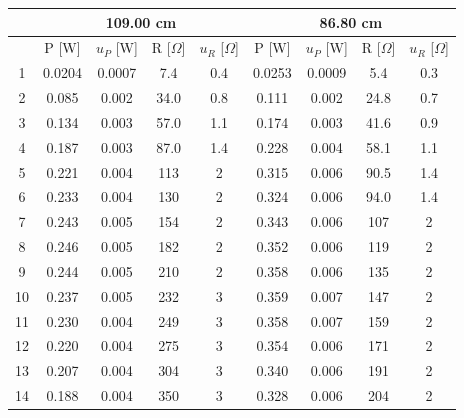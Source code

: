 \documentclass{article}
\begin{document}
{\begin{table}[H]
\begin{tabular}{@{}c|cc|cc||cc|cc@{}}
\toprule
 \multicolumn{1}{l}{}  & \multicolumn{4}{c||}{109.00 cm}                           & \multicolumn{4}{c}{86.80 cm}                         \\ \midrule
 \multicolumn{1}{l}{}  & P [W]  & $u_P$ [W] & R [$\Omega$] & $u_R$ [$\Omega$] & P [W]  & $u_P$ [W] & R [$\Omega$] & $u_R$ [$\Omega$] \\ \midrule
1  & 0.0204 & 0.0007    & 7.4          & 0.4              & 0.0253 & 0.0009    & 5.4          & 0.3              \\
2  & 0.085  & 0.002     & 34.0         & 0.8              & 0.111  & 0.002     & 24.8         & 0.7              \\
3  & 0.134  & 0.003     & 57.0         & 1.1              & 0.174  & 0.003     & 41.6         & 0.9              \\
4  & 0.187  & 0.003     & 87.0         & 1.4              & 0.228  & 0.004     & 58.1         & 1.1              \\
5  & 0.221  & 0.004     & 113          & 2                & 0.315  & 0.006     & 90.5         & 1.4              \\
6  & 0.233  & 0.004     & 130          & 2                & 0.324  & 0.006     & 94.0         & 1.4              \\
7  & 0.243  & 0.005     & 154          & 2                & 0.343  & 0.006     & 107          & 2                \\
8  & 0.246  & 0.005     & 182          & 2                & 0.352  & 0.006     & 119          & 2                \\
9  & 0.244  & 0.005     & 210          & 2                & 0.358  & 0.006     & 135          & 2                \\
10 & 0.237  & 0.005     & 232          & 3                & 0.359  & 0.007     & 147          & 2                \\
11 & 0.230  & 0.004     & 249          & 3                & 0.358  & 0.007     & 159          & 2                \\
12 & 0.220  & 0.004     & 275          & 3                & 0.354  & 0.006     & 171          & 2                \\
13 & 0.207  & 0.004     & 304          & 3                & 0.340  & 0.006     & 191          & 2                \\
14 & 0.188  & 0.004     & 350          & 3                & 0.328  & 0.006     & 204          & 2                \\

\end{tabular}
\end{table}}
\end{document}
